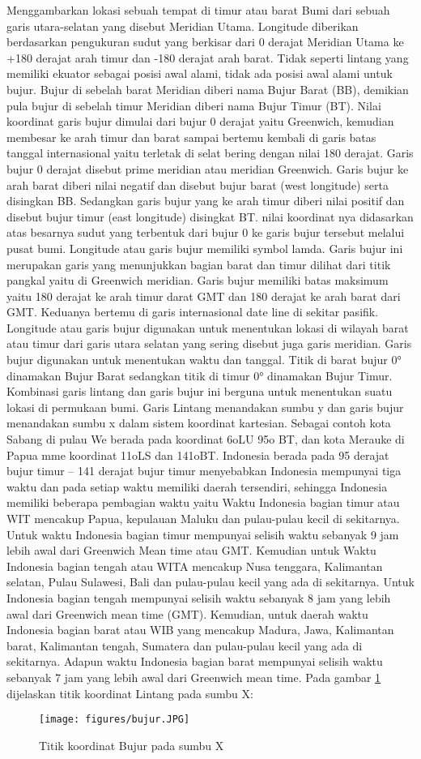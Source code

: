 Menggambarkan lokasi sebuah tempat di timur atau barat Bumi dari sebuah garis utara-selatan yang disebut Meridian Utama. Longitude diberikan berdasarkan pengukuran sudut yang berkisar dari 0 derajat Meridian Utama ke +180 derajat arah timur dan -180 derajat arah barat. Tidak seperti lintang yang memiliki ekuator sebagai posisi awal alami, tidak ada posisi awal alami untuk bujur. Bujur di sebelah barat Meridian diberi nama Bujur Barat (BB), demikian pula bujur di sebelah timur Meridian diberi nama Bujur Timur (BT).
Nilai koordinat garis bujur dimulai dari bujur 0 derajat yaitu Greenwich, kemudian membesar ke arah timur dan barat sampai bertemu kembali di garis batas tanggal internasional yaitu terletak di selat bering dengan nilai 180 derajat. Garis bujur 0 derajat disebut prime meridian atau meridian Greenwich. Garis bujur ke arah barat diberi nilai negatif dan disebut bujur barat (west longitude) serta disingkan BB. Sedangkan garis bujur yang ke arah timur diberi nilai positif dan disebut bujur timur (east longitude) disingkat BT. nilai koordinat nya didasarkan atas besarnya sudut yang terbentuk dari bujur 0 ke garis bujur tersebut melalui pusat bumi.
Longitude atau garis bujur memiliki symbol lamda. Garis bujur ini merupakan garis yang menunjukkan bagian barat dan timur dilihat dari titik pangkal yaitu di Greenwich meridian. Garis bujur memiliki batas maksimum yaitu 180 derajat ke arah timur darat GMT dan 180 derajat ke arah barat dari GMT. Keduanya bertemu di garis internasional date line di sekitar pasifik.
Longitude atau garis bujur digunakan untuk menentukan lokasi di wilayah barat atau timur dari garis utara selatan yang sering disebut juga garis meridian. Garis bujur digunakan untuk menentukan waktu dan tanggal.
Titik di barat bujur 0° dinamakan Bujur Barat sedangkan titik di timur 0° dinamakan Bujur Timur. Kombinasi garis lintang dan garis bujur ini berguna untuk menentukan suatu lokasi di permukaan bumi. Garis Lintang menandakan sumbu y dan garis bujur menandakan sumbu x dalam sistem koordinat kartesian. Sebagai contoh kota Sabang di pulau We berada pada koordinat 6oLU 95o BT, dan kota Merauke di Papua mme koordinat 11oLS dan 141oBT.
Indonesia berada pada 95 derajat bujur timur – 141 derajat bujur timur menyebabkan Indonesia mempunyai tiga waktu dan pada setiap waktu memiliki daerah tersendiri, sehingga Indonesia memiliki beberapa pembagian waktu yaitu Waktu Indonesia bagian timur atau WIT mencakup Papua, kepulauan Maluku dan pulau-pulau kecil di sekitarnya. Untuk waktu Indonesia bagian timur mempunyai selisih waktu sebanyak 9 jam lebih awal dari Greenwich Mean time atau GMT. Kemudian untuk Waktu Indonesia bagian tengah atau WITA mencakup Nusa tenggara, Kalimantan selatan, Pulau Sulawesi, Bali dan pulau-pulau kecil yang ada di sekitarnya. Untuk Indonesia bagian tengah mempunyai selisih waktu sebanyak 8 jam yang lebih awal dari Greenwich mean time (GMT). Kemudian, untuk daerah waktu Indonesia bagian barat atau WIB yang mencakup Madura, Jawa, Kalimantan barat, Kalimantan tengah, Sumatera dan pulau-pulau kecil yang ada di sekitarnya. Adapun waktu Indonesia bagian barat mempunyai selisih waktu sebanyak 7 jam yang lebih awal dari Greenwich mean time.
Pada gambar \ref{bujur} dijelaskan titik koordinat Lintang pada sumbu X:
\begin{figure}[ht]
	\centerline{\texttt{[image: figures/bujur.JPG]}}
	\caption{Titik koordinat Bujur pada sumbu X}

	\label{bujur}
	\end{figure}
